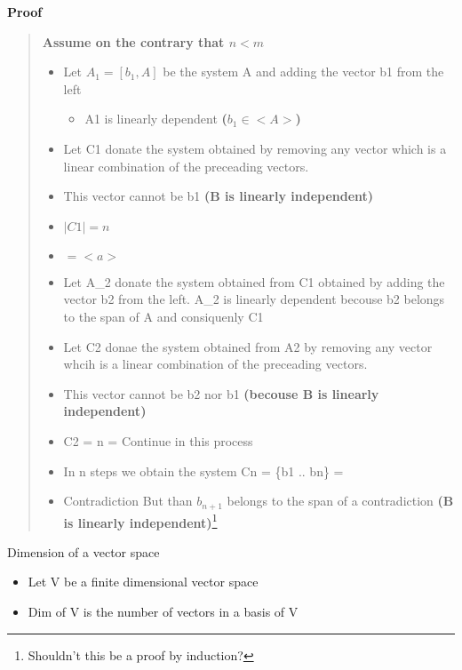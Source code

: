 \documentclass[twocolumn]{article}
\providecommand{\tightlist}{%
  \setlength{\itemsep}{0pt}\setlength{\parskip}{0pt}}
\begin{document}
\textbf{Proof}

\begin{quote}
\textbf{Assume on the contrary that \(n < m\)}

\begin{itemize}
\tightlist
\item
  Let \(A_1 = \left[ b_1, A \right]\) be the system A and adding the
  vector b1 from the left

  \begin{itemize}
  \tightlist
  \item
    A1 is linearly dependent \textbf{(\(b_1 \in <A>\))}
  \end{itemize}
\item
  Let C1 donate the system obtained by removing any vector which is a
  linear combination of the preceading vectors.
\item
  This vector cannot be b1 \textbf{(B is linearly independent)}
\item
  \(|C1| = n\)
\item
  \(<c1> =<a>\)
\item
  Let A\_2 donate the system obtained from C1 obtained by adding the
  vector b2 from the left. A\_2 is linearly dependent becouse b2 belongs
  to the span of A and consiquenly C1
\item
  Let C2 donae the system obtained from A2 by removing any vector whcih
  is a linear combination of the preceading vectors.
\item
  This vector cannot be b2 nor b1 \textbf{(becouse B is linearly
  independent)}
\item
  \textbar{}C2\textbar{} = n = Continue in this process
\item
  In n steps we obtain the system Cn = \{b1 .. bn\} = 
\item
  Contradiction But than \(b_{n+1}\) belongs to the span of a
  contradiction \textbf{(B is linearly independent)}\footnote{Shouldn't
    this be a proof by induction?}
\end{itemize}
\end{quote}

\begin{description}
\item[Dimension of a vector space]
\end{description}

\begin{itemize}
\tightlist
\item
  Let V be a finite dimensional vector space
\item
  Dim of V is the number of vectors in a basis of V
\end{itemize}
\end{document}
